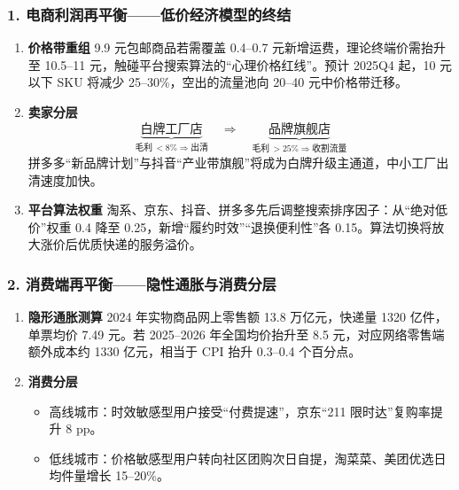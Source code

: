 \subsubsection{1. 电商利润再平衡——低价经济模型的终结}
\begin{enumerate}[leftmargin=*,nosep]
    \item \textbf{价格带重组}  
    9.9 元包邮商品若需覆盖 0.4–0.7 元新增运费，理论终端价需抬升至 10.5–11 元，触碰平台搜索算法的“心理价格红线”。预计 2025Q4 起，10 元以下 SKU 将减少 25–30\%，空出的流量池向 20–40 元中价格带迁移。
    
    \item \textbf{卖家分层}  
    \[
        \underbrace{\text{白牌工厂店}}_{\text{毛利}\,<8\%\Rightarrow\text{出清}}
        \quad\Rightarrow\quad
        \underbrace{\text{品牌旗舰店}}_{\text{毛利}\,>25\%\Rightarrow\text{收割流量}}
    \]
    拼多多“新品牌计划”与抖音“产业带旗舰”将成为白牌升级主通道，中小工厂出清速度加快。

    \item \textbf{平台算法权重}  
    淘系、京东、抖音、拼多多先后调整搜索排序因子：从“绝对低价”权重 0.4 降至 0.25，新增“履约时效”“退换便利性”各 0.15。算法切换将放大涨价后优质快递的服务溢价。
\end{enumerate}

\subsubsection{2. 消费端再平衡——隐性通胀与消费分层}
\begin{enumerate}[leftmargin=*,nosep]
    \item \textbf{隐形通胀测算}  
    2024 年实物商品网上零售额 13.8 万亿元，快递量 1320 亿件，单票均价 7.49 元。若 2025–2026 年全国均价抬升至 8.5 元，对应网络零售端额外成本约 1330 亿元，相当于 CPI 抬升 0.3–0.4 个百分点。
    
    \item \textbf{消费分层}  
    \begin{itemize}[nosep]
        \item 高线城市：时效敏感型用户接受“付费提速”，京东“211 限时达”复购率提升 8 pp。
        \item 低线城市：价格敏感型用户转向社区团购次日自提，淘菜菜、美团优选日均件量增长 15–20\%。
    \end{itemize}
\end{enumerate}

